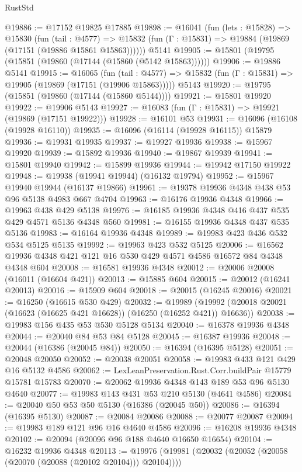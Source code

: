 \begin{lexlean}{RustStd}
\begin{coremodule}
@19886 := @17152 @19825 @17885
@19898 := @16041
    (fun (lets : @15828) =>
    @15830
      (fun (tail : @4577) =>
      @15832 (fun (Γ : @15831) => @19884 (@19869 (@17151 (@19886 @15861 @15863))))))
    @5141
@19905 := @15801 (@19795 (@15851 (@19860 (@17144 (@15860 (@5142 @15863))))))
@19906 := @19886 @5141
@19915 := @16065
    (fun (tail : @4577) => @15832 (fun (Γ : @15831) => @19905 (@19869 (@17151 (@19906 @15863)))))
    @5143
@19920 := @19795 (@15851 (@19860 (@17144 (@15860 @5144))))
@19921 := @15801 @19920
@19922 := @19906 @5143
@19927 := @16083 (fun (Γ : @15831) => @19921 (@19869 (@17151 @19922)))
@19928 := @16101 @53
@19931 := @16096 (@16108 (@19928 @16110))
@19935 := @16096 (@16114 (@19928 @16115)) @15879
@19936 := @19931 @19935
@19937 := @19927 @19936
@19938 := @15967 @19920
@19939 := @15892 @19936
@19940 := @19867 @19939
@19941 := @15801 @19940
@19942 := @15899 @19936
@19944 := @19942 @17150 @19922
@19948 := @19938 (@19941 @19944) (@16132 @19794)
@19952 := @15967 @19940 @19944 (@16137 @19866)
@19961 := @19378 @19936 @4348 @438 @53 @96 @5138 @4983 @667 @4704
@19963 := @16176 @19936 @4348
@19966 := @19963 @438 @429 @5138
@19976 := @16185 @19936 @4348 @416 @437 @535 @429 @4571 @5136 @4348 @560
@19981 := @16155 @19936 @4348 @437 @535 @5136
@19983 := @16164 @19936 @4348
@19989 := @19983 @423 @436 @532 @534 @5125 @5135
@19992 := @19963 @423 @532 @5125
@20006 := @16562 @19936 @4348 @421 @121 @16 @530 @429 @4571 @4586 @16572 @84 @4348 @4348 @604
@20008 := @16581 @19936 @4348
@20012 := @20006 @20008 (@16011 (@16604 @421))
@20013 := @15885 @604
@20015 := @20012 (@16241 @20013)
@20016 := @15909 @604
@20018 := @20015 (@16245 @20016)
@20021 := @16250 (@16615 @530 @429)
@20032 := @19989
    (@19992 (@20018 @20021 (@16623 (@16625 @421 @16628)) (@16250 (@16252 @421)) @16636))
@20038 := @19983 @156 @435 @53 @530 @5128 @5134
@20040 := @16378 @19936 @4348
@20044 := @20040 @84 @53 @84 @5128
@20045 := @16387 @19936
@20048 := @20044 (@16386 (@20045 @84))
@20050 := @16394 (@16395 @5128)
@20051 := @20048 @20050
@20052 := @20038 @20051
@20058 := @19983 @433 @121 @429 @16 @5132 @4586
@20062 := LexLeanPreservation.Rust.Corr.buildPair @15779 @15781 @15783
@20070 := @20062 @19936 @4348 @143 @189 @53 @96 @5130 @4640
@20077 := @19983 @143 @431 @53 @210 @5130 (@4641 @4586)
@20084 := @20040 @50 @53 @50 @5130 (@16386 (@20045 @50))
@20086 := @16394 (@16395 @5130)
@20087 := @20084 @20086
@20088 := @20077 @20087
@20094 := @19983 @189 @121 @96 @16 @4640 @4586
@20096 := @16208 @19936 @4348
@20102 := @20094 (@20096 @96 @188 @4640 @16650 @16654)
@20104 := @16232 @19936 @4348
@20113 := @19976 (@19981 (@20032 (@20052 (@20058 (@20070 (@20088 (@20102 @20104))) @20104))))

\end{coremodule}
\end{lexlean}
